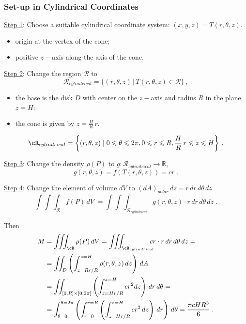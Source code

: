 \begin{frame}
  \frametitle{Set-up in Cylindrical Coordinates}

\underline{Step 1}: Choose a suitable cylindrical coordinate system: $(x,y,z) = T(r, \theta, z)$.
%
\begin{itemize}
\item origin at the vertex of the cone;
\item positive $z-$axis along the axis of the cone.
\end{itemize}

\underline{Step 2}: Change the region $\mathcal{R}$ to
      $$\mathcal{R}_{cylindrical} = \{(r,\theta,z) \, | \, T(r,\theta,z) \in \mathcal{R} \}\, ,$$
      \begin{itemize}
      \item the base is the disk $D$ with center on the $z-$axis and radius $R$ in the plane $z=H$;
      \item the cone is given by $z= \frac{H}{R}\,r$.
      \end{itemize}
$$\cR_{cylindrical} = \left\{ (r,\theta,z) \; | \; 0 \leqslant \theta \leqslant 2\pi, 0 \leqslant r \leqslant R, \frac{H}{R} \,r \leqslant z \leqslant H\right\} \, .$$
      
      \end{frame}
      
 \begin{frame}
\underline{Step 3}: Change the density $\rho(P)$ to $g \colon \mathcal{R}_{cylindrical} \to \mathbb{R}$,
      $$g(r,\theta,z) = f(T(r,\theta,z)) =  cr\; .$$

\underline{Step 4}: Change the element of volume $dV$ to $ (dA)_{polar} \, dz = r \,dr\, d\theta \, dz$.
%
$$\int\!\!\!\int\!\!\!\int_{\mathcal{R}} f(P) \, dV\; = \int\!\!\!\int\!\!\!\int_{\mathcal{R}_{cylindrical}} g(r,\theta,z) \cdot r\,dr\,d\theta \, dz \; .$$

Then
%
\begin{align*}
  M & = \int\!\!\!\int\!\!\!\int_{\cR} \rho(P) \, dV = \int\!\!\!\int\!\!\!\int_{\cR_{cylindrical}} \!\!\!\!\! cr \cdot r\,dr\,d\theta\,dz = \\
%
  & = \int\!\!\!\int_{D} \left( \int_{z=Rr/R}^{z=H} \rho(r,\theta,z) \, dz \right) \, dA \\
  & = \int\!\!\!\int_{[0,R]\times [0,2\pi]} \left( \int_{z=Hr/R}^{z=H} cr^2 dz \right) \, dr\, d\theta = \\
  & = \int_{\theta =0}^{\theta=2\pi} \left( \int_{r=0}^{r=R} \left( \int_{z=Hr/R}^{z=H} cr^2 \, dz \right) \, dr \right) \, d\theta  = \frac{\pi c H R^3}{6}\; .
\end{align*}
%
\end{frame}

